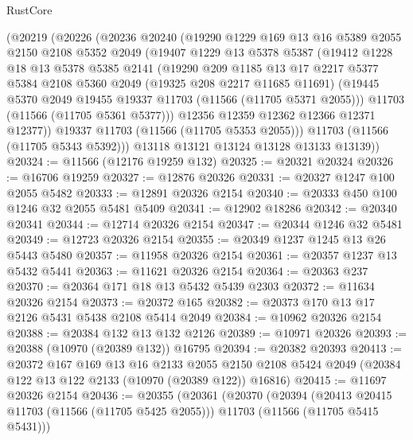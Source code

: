 \begin{lexlean}{RustCore}
\begin{coremodule}
    (@20219
      (@20226
        (@20236
          @20240
          (@19290
            @1229
            @169
            @13
            @16
            @5389
            @2055
            @2150
            @2108
            @5352
            @2049
            (@19407
              @1229
              @13
              @5378
              @5387
              (@19412
                @1228
                @18
                @13
                @5378
                @5385
                @2141
                (@19290
                  @209
                  @1185
                  @13
                  @17
                  @2217
                  @5377
                  @5384
                  @2108
                  @5360
                  @2049
                  (@19325 @208 @2217 @11685 @11691)
                  (@19445 @5370 @2049 @19455 @19337 @11703 (@11566 (@11705 @5371 @2055)))
                  @11703
                  (@11566 (@11705 @5361 @5377)))
                @12356
                @12359
                @12362
                @12366
                @12371
                @12377))
            @19337
            @11703
            (@11566 (@11705 @5353 @2055)))
          @11703
          (@11566 (@11705 @5343 @5392)))
        @13118
        @13121
        @13124
        @13128
        @13133
        @13139))
@20324 := @11566 (@12176 @19259 @132)
@20325 := @20321 @20324
@20326 := @16706 @19259
@20327 := @12876 @20326
@20331 := @20327 @1247 @100 @2055 @5482
@20333 := @12891 @20326 @2154
@20340 := @20333 @450 @100 @1246 @32 @2055 @5481 @5409
@20341 := @12902 @18286
@20342 := @20340 @20341
@20344 := @12714 @20326 @2154
@20347 := @20344 @1246 @32 @5481
@20349 := @12723 @20326 @2154
@20355 := @20349 @1237 @1245 @13 @26 @5443 @5480
@20357 := @11958 @20326 @2154
@20361 := @20357 @1237 @13 @5432 @5441
@20363 := @11621 @20326 @2154
@20364 := @20363 @237
@20370 := @20364 @171 @18 @13 @5432 @5439 @2303
@20372 := @11634 @20326 @2154
@20373 := @20372 @165
@20382 := @20373 @170 @13 @17 @2126 @5431 @5438 @2108 @5414 @2049
@20384 := @10962 @20326 @2154
@20388 := @20384 @132 @13 @132 @2126
@20389 := @10971 @20326
@20393 := @20388 (@10970 (@20389 @132)) @16795
@20394 := @20382 @20393
@20413 := @20372
    @167
    @169
    @13
    @16
    @2133
    @2055
    @2150
    @2108
    @5424
    @2049
    (@20384 @122 @13 @122 @2133 (@10970 (@20389 @122)) @16816)
@20415 := @11697 @20326 @2154
@20436 := @20355
    (@20361
      (@20370
        (@20394
          (@20413 @20415 @11703 (@11566 (@11705 @5425 @2055)))
          @11703
          (@11566 (@11705 @5415 @5431)))

\end{coremodule}
\end{lexlean}
